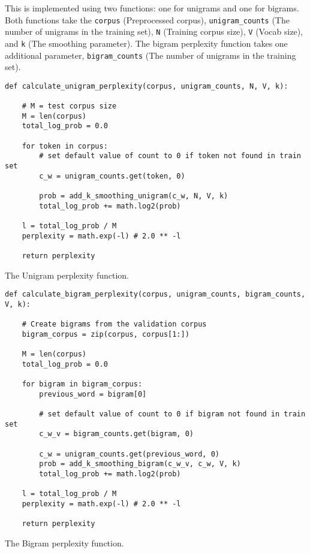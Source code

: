 \documentclass[a4paper]{article}
\begin{document}
This is implemented using two functions: one for unigrams and one for bigrams. Both functions take the \texttt{corpus} (Preprocessed corpus), \texttt{unigram\_counts} (The number of unigrams in the training set), \texttt{N} (Training corpus size), \texttt{V} (Vocab size), and \texttt{k} (The smoothing parameter). The bigram perplexity function takes one additional parameter, \texttt{bigram\_counts} (The number of unigrams in the training set). \\

    \begin{listing}[ht]
    \begin{verbatim}
def calculate_unigram_perplexity(corpus, unigram_counts, N, V, k):

    # M = test corpus size
    M = len(corpus)
    total_log_prob = 0.0

    for token in corpus:
        # set default value of count to 0 if token not found in train set
        c_w = unigram_counts.get(token, 0) 
        
        prob = add_k_smoothing_unigram(c_w, N, V, k)
        total_log_prob += math.log2(prob)

    l = total_log_prob / M
    perplexity = math.exp(-l) # 2.0 ** -l

    return perplexity
    \end{verbatim}
    \caption{The Unigram perplexity function.}
    \label{lst:unigram_perplexity}
    \end{listing}

    \begin{listing}
                \begin{verbatim}
def calculate_bigram_perplexity(corpus, unigram_counts, bigram_counts, V, k):

    # Create bigrams from the validation corpus
    bigram_corpus = zip(corpus, corpus[1:])

    M = len(corpus)
    total_log_prob = 0.0

    for bigram in bigram_corpus:
        previous_word = bigram[0]
        
        # set default value of count to 0 if bigram not found in train set
        c_w_v = bigram_counts.get(bigram, 0) 
        
        c_w = unigram_counts.get(previous_word, 0)
        prob = add_k_smoothing_bigram(c_w_v, c_w, V, k)
        total_log_prob += math.log2(prob)

    l = total_log_prob / M
    perplexity = math.exp(-l) # 2.0 ** -l

    return perplexity
    \end{verbatim}
    \caption{The Bigram perplexity function.}
    \label{lst:bigram_perplexity}
    \end{listing}
\end{document}

